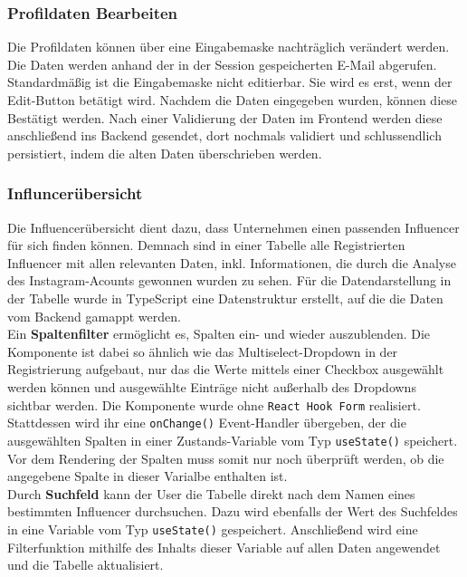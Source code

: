\documentclass[conference,a4paper,flushend]{cs-techrep}
\begin{document}
\subsubsection{Profildaten Bearbeiten\\}
Die Profildaten können über eine Eingabemaske nachträglich verändert werden. Die Daten werden anhand der in der Session gespeicherten E-Mail abgerufen. Standardmäßig ist die Eingabemaske nicht editierbar. Sie wird es erst, wenn der Edit-Button betätigt wird. Nachdem die Daten eingegeben wurden, können diese Bestätigt werden. Nach einer Validierung der Daten im Frontend werden diese anschließend ins Backend gesendet, dort nochmals validiert und schlussendlich persistiert, indem die alten Daten überschrieben werden.

\subsubsection{Influncerübersicht\\}
Die Influencerübersicht dient dazu, dass Unternehmen einen passenden Influencer für sich finden können. Demnach sind in einer Tabelle alle Registrierten Influencer mit allen relevanten Daten, inkl. Informationen, die durch die Analyse des Instagram-Acounts gewonnen wurden zu sehen. %
Für die Datendarstellung in der Tabelle wurde in TypeScript eine Datenstruktur erstellt, auf die die Daten vom Backend gamappt werden. %
\\
Ein \textbf{Spaltenfilter} ermöglicht es, Spalten ein- und wieder auszublenden. Die Komponente ist dabei so ähnlich wie das Multiselect-Dropdown in der Registrierung aufgebaut, nur das die Werte mittels einer Checkbox ausgewählt werden können und ausgewählte Einträge nicht außerhalb des Dropdowns sichtbar werden. Die Komponente wurde ohne \texttt{React Hook Form} realisiert. Stattdessen wird ihr eine \texttt{onChange()} Event-Handler übergeben, der die ausgewählten Spalten in einer Zustands-Variable vom Typ \texttt{useState()} speichert. Vor dem Rendering der Spalten muss somit nur noch überprüft werden, ob die angegebene Spalte in dieser Varialbe enthalten ist. 
\\
Durch \textbf{Suchfeld} kann der User die Tabelle direkt nach dem Namen eines bestimmten Influencer durchsuchen. Dazu wird ebenfalls der Wert des Suchfeldes in eine Variable vom Typ \texttt{useState()} gespeichert. Anschließend wird eine Filterfunktion mithilfe des Inhalts dieser Variable auf allen Daten angewendet und die Tabelle aktualisiert.
\end{document}
